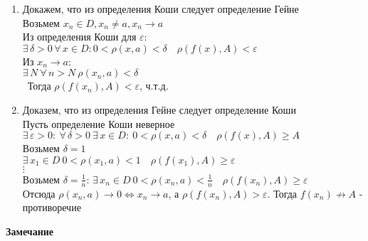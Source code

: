 \documentclass[12pt]{article}
\begin{document}
\begin{enumerate}
    \item Докажем, что из определения Коши следует определение Гейне\\
        Возьмем $x_n \in D, x_n \neq a, x_n \rightarrow a$\\
        Из определения Коши для $\varepsilon$:\\
        $\exists\,\delta>0\,\forall\,x\in D: 0<\rho(x,a)<\delta\quad\rho(f(x),A) < \varepsilon$\\
        Из $x_n \rightarrow a$:\\
        $\exists\,N\ \forall\,n>N\ \rho(x_n,a)<\delta$\\\
        Тогда $\rho(f(x_n),A) < \varepsilon$, ч.т.д.
    \item Доказем, что из определения Гейне следует определение Коши\\
        Пусть определение Коши неверное\\
        $\exists\,\varepsilon > 0:\ \forall\,\delta>0\ \exists\,x\in D:\ 0<\rho(x,a)<\delta\quad\rho(f(x),A) \geq A$\\
        Возьмем $\delta = 1$\\
        $\exists\, x_1\in D\ 0<\rho(x_1,a)<1\quad \rho(f(x_1),A) \geq \varepsilon$\\
        $\vdots$\\
        Возьмем $\delta=\frac 1n$:
        $\exists\, x_n\in D\ 0<\rho(x_n,a)<\frac 1n\quad \rho(f(x_n),A) \geq \varepsilon$\\
        Отсюда $\rho(x_n,a) \rightarrow 0 \Leftrightarrow x_n \rightarrow a$, а $\rho(f(x_n),A) > \varepsilon$. Тогда $f(x_n)\nrightarrow A$ - противоречие
    \end{enumerate}
\textbf{Замечание}
\end{document}
